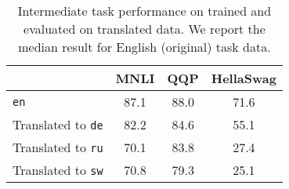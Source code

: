 \documentclass[11pt,a4paper]{article}
\begin{document}
\begin{table*}[t!]
\centering \small
\begin{tabular}{lccc}
\toprule
& MNLI & QQP & HellaSwag \\
\midrule
\texttt{en} & 87.1 & 88.0 & 71.6 \\
Translated to \texttt{de} & 82.2 & 84.6& 55.1 \\
Translated to \texttt{ru} & 70.1 & 83.8 & 27.4 \\
Translated to \texttt{sw} & 70.8 & 79.3 & 25.1 \\
\bottomrule
\end{tabular}
\caption{Intermediate task performance on trained and evaluated on translated data. We report the median result for English (original) task data.}
\label{tab:translated_intermediate_performance}
\end{table*}
\end{document}
